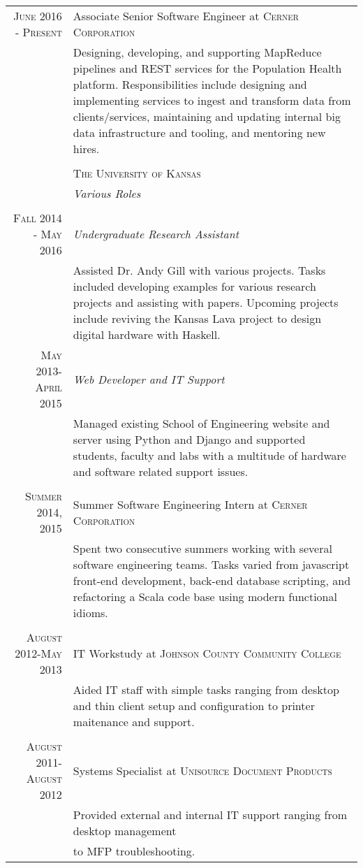 \documentclass[10pt]{article} %
\begin{document}
\begin{tabular}{r|p{11cm}}
   \textsc{June 2016 - Present} & Associate Senior Software Engineer at \textsc{Cerner Corporation} \\
   & \footnotesize{Designing, developing, and supporting MapReduce pipelines and REST services for the Population
     Health platform. Responsibilities include designing and implementing services to ingest and transform data
     from clients/services, maintaining and updating internal big data infrastructure and tooling,
     and mentoring new hires.} \\
  \multicolumn{2}{c}{} \\
& \textsc{The University of Kansas} \\
& \emph{Various Roles}\\ \\
\textsc{Fall 2014 - May 2016} & \emph{Undergraduate Research Assistant} \\
& \footnotesize{Assisted Dr. Andy Gill with various projects. Tasks included developing examples for various
research projects and assisting with papers. Upcoming projects include reviving the Kansas Lava project to
design digital hardware with Haskell.}\\
\textsc{May 2013-April 2015} & \emph{Web Developer and IT Support}\\ 
& \footnotesize{Managed existing School of Engineering website and server using Python and Django and supported students, faculty 
and labs with a multitude of hardware and software related support issues.}\\
\multicolumn{2}{c}{} \\



\textsc{Summer 2014, 2015} & Summer Software Engineering Intern at \textsc{Cerner Corporation} \\
& \footnotesize{Spent two consecutive summers working with several software engineering teams. Tasks varied from
javascript front-end development, back-end database scripting, and refactoring a Scala code base using modern functional idioms.}\\
\multicolumn{2}{c}{} \\

\textsc{August 2012-May 2013} & IT Workstudy at \textsc{Johnson County Community College} \\
& \footnotesize{Aided IT staff with simple tasks ranging from desktop and thin client setup and configuration to printer 
 maitenance and support.}\\
\multicolumn{2}{c}{} \\


\textsc{August 2011-August 2012} & Systems Specialist at \textsc{Unisource Document Products} \emph{}\\
& \footnotesize{Provided external and internal IT support ranging from desktop management} \\ & \footnotesize{to MFP troubleshooting.}\\
\end{tabular} 
\end{document}
